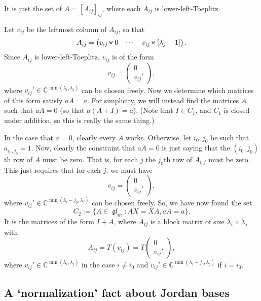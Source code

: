 \documentclass[12pt,psamsfonts]{article}
\newcommand{\leftshift}{\,\texttt{<<}\,}
\newcommand{\downshift}{\mathbin{\rotatebox[origin=c]{90}{\leftshift}}}
\DeclareMathOperator{\gl}{\mathfrak{gl}}
\begin{document}
It is just the set of \(A = [A_{ij}]_{ij}\), where each \(A_{ij}\) is lower-left-Toeplitz.
\par Let \(v_{ij}\) be the leftmost column of \(A_{ij}\), so that
\[A_{ij} = \begin{pmatrix}
    v_{ij} \downshift 0 & \cdots & v_{ij} \downshift [\lambda_j - 1]
\end{pmatrix}.\]
Since \(A_{ij}\) is lower-left-Toeplitz, \(v_{ij}\) is of the form 
\[v_{ij} = \begin{pmatrix}
    0\\
    v_{ij}'
\end{pmatrix},\]
where \(v_{ij}' \in \mathbb{C}^{\min(\lambda_i, \lambda_j)}\) can be chosen freely.
Now we determine which matrices of this form satisfy \(aA = a\).
For simplicity, we will instead find the matrices \(A\) such that \(aA = 0\) (so that \(a(A + I) = a\)).
(Note that \(I \in C_1\), and \(C_1\) is closed under addition, so this is really the same thing.)
\par In the case that \(a = 0\), clearly every \(A\) works.
Otherwise, let \(i_0, j_0\) be such that \(a_{i_0,j_0} = 1\).
Now, clearly the constraint that \(aA = 0\) is just saying that the \((i_0,j_0)\)th row of \(A\) must be zero.
That is, for each \(j\) the \(j_0\)th row of \(A_{i_0j}\) must be zero.
This just requires that for each \(j\), we must have 
\[v_{ij} = \begin{pmatrix}
    0\\
    v_{ij}'
\end{pmatrix},\]
where \(v_{ij}' \in \mathbb{C}^{\min(\lambda_i - j_0, \lambda_j)}\) can be chosen freely.
So, we have now found the set 
\[C_2 := \{A \in \gl_m : AX = XA, aA = a\}.\]
It is the matrices of the form \(I + A\), where \(A_{ij}\) is a block matrix of size \(\lambda_i \times \lambda_j\) with 
\[A_{ij} = T(v_{ij}) = T\begin{pmatrix}
    0\\
    v_{ij}'
\end{pmatrix},\]
where \(v_{ij}' \in \mathbb{C}^{\min(\lambda_i, \lambda_j)}\) in the case \(i \neq i_0\) and \(v_{ij}' \in \mathbb{C}^{\min(\lambda_i - j_0, \lambda_j)}\) if \(i = i_0\).

\subsection{A `normalization' fact about Jordan bases}
\end{document}
